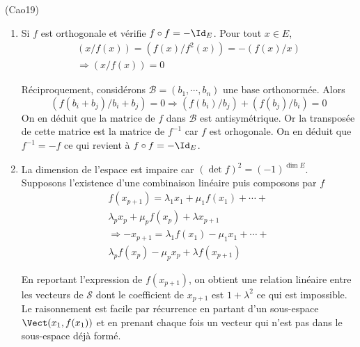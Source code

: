 \begin{tiny}(Cao19)\end{tiny}
\begin{enumerate}
 \item Si $f$ est orthogonale et vérifie $f\circ f =-\Id_E$. Pour tout $x\in E$,
\begin{multline*}
 (x/f(x))=(f(x)/f^2(x))=-(f(x)/x) \\ \Rightarrow (x/f(x))=0
\end{multline*}

Réciproquement, considérons $\mathcal{B}=(b_1,\cdots,b_n)$ une base orthonormée. Alors
\begin{displaymath}
 (f(b_i+b_j)/b_i+b_j)=0\Rightarrow (f(b_i)/b_j)+(f(b_j)/b_i)=0
\end{displaymath}
On en déduit que la matrice de $f$ dans $\mathcal{B}$ est antisymétrique. Or la transposée de cette matrice est la matrice de $f^{-1}$ car $f$ est orhogonale. On en déduit que $f^{-1}=-f$ ce qui revient à $f\circ f =-\Id_E$.
\item La dimension de l'espace est impaire car $(\det f)^2=(-1)^{\dim E}$. Supposons l'existence d'une combinaison linéaire puis composons par $f$
\begin{multline*}
 f(x_{p+1})=\lambda_1x_1+\mu_1f(x_1)+\cdots +\\ \lambda_px_p+\mu_pf(x_p)+\lambda x_{p+1}\\
\Rightarrow
-x_{p+1}= \lambda_1f(x_1)-\mu_1 x_1+\cdots + \\\lambda_pf(x_p)-\mu_p x_p +\lambda f(x_{p+1})
\end{multline*}

En reportant l'expression de $f(x_{p+1})$, on obtient une relation linéaire entre les vecteurs de $\mathcal{S}$ dont le coefficient de $x_{p+1}$ est $1+\lambda^2$ ce qui est impossible.\newline
Le raisonnement est facile par récurrence en partant d'un sous-espace $\Vect(x_1,f(x_1))$ et en prenant chaque fois un vecteur qui n'est pas dans le sous-espace déjà formé.
\end{enumerate}
 
